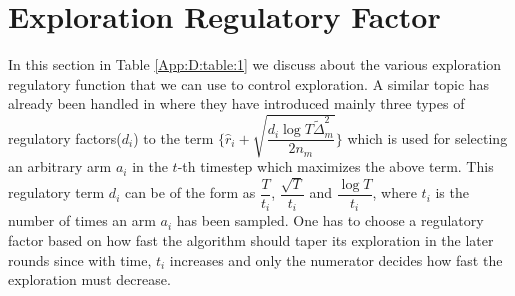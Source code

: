 %


\section{Exploration Regulatory Factor}
\label{App:D}
In this section in Table \ref{App:D:table:1} we discuss about the various exploration regulatory function that we can use to control exploration. A similar topic has already been handled in \cite{liu2016modification} where they have introduced mainly three types of regulatory factors($d_{i}$) to the term $\bigg\lbrace\hat{r}_{i}+\sqrt{\dfrac{d_{i}\log T\tilde{\Delta}_{m}^{2}}{2n_{m}}}\bigg\rbrace$ which is used for selecting an arbitrary arm $a_{i}$ in the $t$-th timestep which maximizes the above term. This regulatory term $d_{i}$ can be of the form as $\dfrac{T}{t_{i}}$, $\dfrac{\sqrt{T}}{t_{i}}$ and $\dfrac{\log T}{t_{i}}$, where $t_{i}$ is the number of times an arm $a_{i}$ has been sampled. One has to choose a regulatory factor based on how fast the algorithm should taper its exploration in the later rounds since with time, $t_{i}$ increases and only the numerator decides how fast the exploration must decrease.


